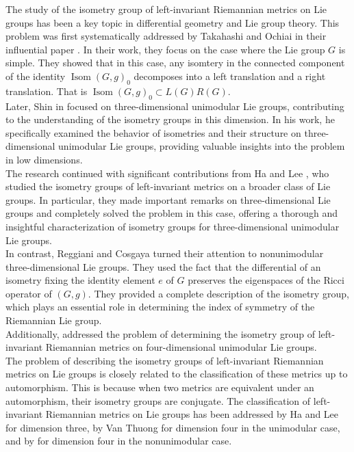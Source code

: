 \documentclass[12pt,a4paper,twoside]{article}
\theoremstyle{definition}
\begin{document}
\hspace*{3mm}  The study of the isometry group of left-invariant Riemannian metrics on Lie groups has been a key topic in differential geometry and Lie group theory. This problem was first systematically addressed by Takahashi and Ochiai in their influential paper \cite{ochiai1976group}. In their work, they focus on the case where the Lie group $G$ is simple. They showed that in this case, any isomtery in the connected component of the identity $\operatorname{Isom}(G, g)_0$ decomposes into a left translation and a right translation. That is $\operatorname{Isom}(G, g)_0 \subset L(G)R(G)$.\\
Later, Shin in \cite{shin1997isometry} focused on three-dimensional unimodular Lie groups, contributing to the understanding of the isometry groups in this dimension. In his work, he specifically examined the behavior of isometries and their structure on three-dimensional unimodular Lie groups, providing valuable insights into the problem in low dimensions.\\
The research continued with significant contributions from Ha and Lee \cite{ha2012isometry}, who studied the isometry groups of left-invariant metrics on a broader class of Lie groups. In particular, they made important remarks on three-dimensional Lie groups and completely solved the problem in this case, offering a thorough and insightful characterization of isometry groups for three-dimensional unimodular Lie groups.\\
In contrast, Reggiani and Cosgaya \cite{ana2022isometry} turned their attention to nonunimodular three-dimensional Lie groups. They used the fact that the differential of an isometry fixing the identity element $e$ of $G$ preserves the eigenspaces of the Ricci operator of $(G,g)$. They provided a complete description of the isometry group, which plays an essential role in determining the index of symmetry of the Riemannian Lie group.\\
Additionally, \cite{ayad2024isometry,aitbenhaddou2024isometry} addressed the problem of determining the isometry group of left-invariant Riemannian metrics on four-dimensional unimodular Lie groups.\\
\hspace*{3mm}   The problem of describing the isometry groups of left-invariant Riemannian metrics on Lie groups is closely related to the classification of these metrics up to automorphism. This is because when two metrics are equivalent under an automorphism, their isometry groups are conjugate. The classification of left-invariant Riemannian metrics on Lie groups has been addressed by Ha and Lee \cite{ha2009left} for dimension three, by Van Thuong \cite{van2017metrics} for dimension four in the unimodular case, and by \cite{aitbenhaddou2025classification} for dimension four in the nonunimodular case.\\
\end{document}
